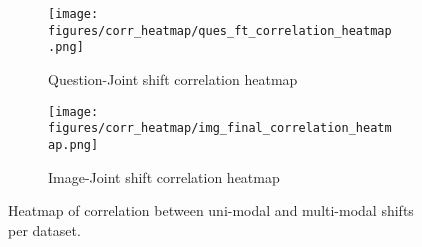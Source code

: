 \begin{figure}[!h]
    \centering
    \begin{subfigure}[t]{0.8\linewidth}
        \centering
        \texttt{[image: figures/corr\_heatmap/ques\_ft\_correlation\_heatmap.png]}
        \caption{Question-Joint shift correlation heatmap}
        \label{fig:ques_ft_correlation_heatmap}
    \end{subfigure}
    \begin{subfigure}[t]{0.8\linewidth}
        \centering
        \texttt{[image: figures/corr\_heatmap/img\_final\_correlation\_heatmap.png]}
        \caption{Image-Joint shift correlation heatmap}
        \label{fig:img_final_correlation_heatmap}
    \end{subfigure}
    \caption{Heatmap of correlation between uni-modal and multi-modal shifts per dataset.}
    \label{fig:crosscorrheatmap}
\end{figure}
